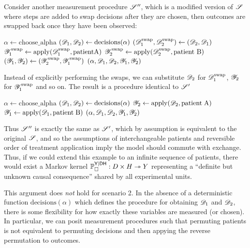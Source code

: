 Consider another measurement procedure $\mathscr{S}''$, which is a modified version of $\mathscr{S}$ where steps are added to swap decisions after they are chosen, then outcomes are swapped back once they have been observed:

\begin{algorithmic}
    \State $\alpha \gets \mathrm{choose\_alpha}$
    \State $(\mathscr{D}_1,\mathscr{D}_2) \gets \mathrm{decisions}(\alpha)$
    \State $(\mathscr{D}_1^{\mathrm{swap}},\mathscr{D}_2^{\mathrm{swap}}) \gets (\mathscr{D}_2,\mathscr{D}_1)$
    \State $\mathscr{Y}^{\mathrm{swap}}_1\gets \mathrm{apply}(\mathscr{D}_1^{\mathrm{swap}},\mathrm{patient A})$
    \State $\mathscr{Y}_2^{\mathrm{swap}}\gets \mathrm{apply}(\mathscr{D}_2^{\text{swap}},\text{patient B})$
    \State $(\mathscr{Y}_1,\mathscr{Y}_2)\gets (\mathscr{Y}^{\mathrm{swap}}_2,\mathscr{Y}^{\mathrm{swap}}_1)$
    \State \Return $(\alpha,\mathscr{D}_1,\mathscr{D}_2,\mathscr{Y}_1,\mathscr{Y}_2)$
    \EndProcedure
\end{algorithmic}

Instead of explicitly performing the swaps, we can substitute $\mathscr{D}_2$ for $\mathscr{D}_1^{\text{swap}}$, $\mathscr{Y}_2$ for $\mathscr{Y}_1^{\text{swap}}$ and so on. The result is a procedure identical to $\mathscr{S}'$

\begin{algorithmic}
    \State $\alpha \gets \mathrm{choose\_alpha}$
    \State $(\mathscr{D}_1,\mathscr{D}_2) \gets \mathrm{decisions}(\alpha)$
    \State $\mathscr{Y}_2\gets \mathrm{apply}(\mathscr{D}_2,\mathrm{patient\;A})$
    \State $\mathscr{Y}_1\gets \mathrm{apply}(\mathscr{D}_1,\mathrm{patient\;B})$
    \State \Return $(\alpha,\mathscr{D}_1,\mathscr{D}_2,\mathscr{Y}_1,\mathscr{Y}_2)$
    \EndProcedure
\end{algorithmic}

Thus $\mathscr{S}''$ is exactly the same as $\mathscr{S}'$, which by assumption is equivalent to the original $\mathscr{S}$, and so the assumptions of interchangeable patients and reversible order of treatment application imply the model should commute with exchange. Thus, if we could extend this example to an infinite sequence of patients, there would exist a Markov kernel $\mathbb{P}_\square^{\mathsf{Y}|\mathsf{DH}}:D\times H\rightarrowtriangle Y$ representing a ``definite but unknown causal consequence'' shared by all experimental units.

This argument does \emph{not} hold for scenario 2. In the absence of a deterministic function $\text{decisions}(\alpha)$ which defines the procedure for obtaining $\mathscr{D}_1$ and $\mathscr{D}_2$, there is some flexibility for how exactly these variables are measured (or chosen). In particular, we can posit measurement procedures such that permuting patients is not equivalent to permuting decisions and then appying the reverse permutation to outcomes.

